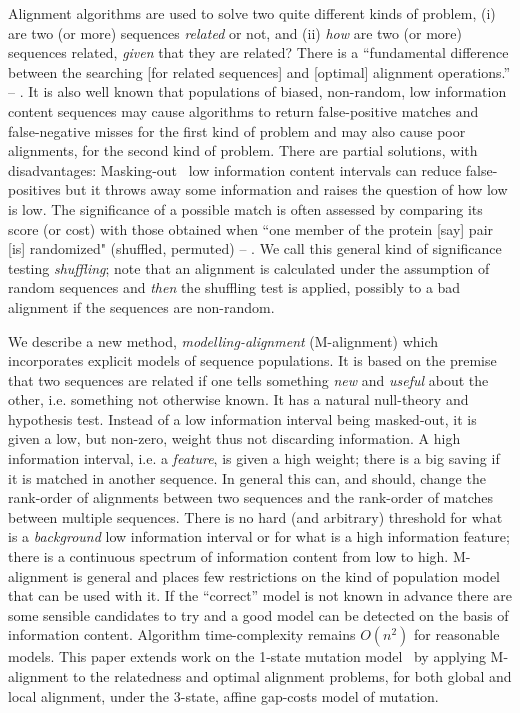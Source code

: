 \documentclass[letterpaper,11pt,oneside]{article}
\begin{document}
\begin{multicols}{2}
Alignment algorithms are used to solve two quite different kinds of problem,
(i) are two (or more) sequences {\em related} or not, and
(ii) {\em how} are two (or more) sequences related,
{\em given} that they are related?
There is a ``fundamental difference between
the searching [for related sequences] and [optimal] alignment operations.'' --
\cite{gribskov96}.
It is also well known that populations of biased, non-random,
low information content sequences may cause algorithms
to return false-positive matches and false-negative misses for
the first kind of problem and may also cause poor alignments,
for the second kind of problem.
There are partial solutions, with disadvantages:
Masking-out~\cite{claverie93} low information content intervals
can reduce false-positives but it throws away some information and
raises the question of how low is low.
The significance of a possible match is often assessed by comparing
its score (or cost) with those obtained when ``one member of
the protein [say] pair [is] randomized"
(shuffled, permuted) -- \cite{needleman70}.
We call this general kind of significance testing {\em shuffling};
note that an alignment is calculated under the assumption of random sequences
and {\em then} the shuffling test is applied, possibly to a bad alignment
if the sequences are non-random.

We describe a new method, {\em modelling-alignment} (M-alignment)
which incorporates explicit models of sequence populations.
It is based on the premise that two sequences are related if one tells
something {\em new} and {\em useful} about the other,
i.e. something not otherwise known.
It has a natural null-theory and hypothesis test.
Instead of a low information interval being masked-out, it is given
a low, but non-zero, weight thus not discarding information.
A high information interval, i.e. a {\em feature}, is given a high weight;
there is a big saving if it is matched in another sequence.
In general this can, and should, change the rank-order of alignments
between two sequences and the rank-order of matches between multiple sequences.
There is no hard (and arbitrary) threshold for what is
a {\em background} low information interval or
for what is a high information feature;
there is a continuous spectrum of information content from low to high.
M-alignment is general and places few restrictions on the kind
of population model that can be used with it.
If the ``correct'' model is not known in advance
there are some sensible candidates to try
and a good model can be detected on the basis of information content.
Algorithm time-complexity remains $O(n^2)$ for reasonable models.
This paper extends work on the 1-state mutation model~\cite{allison99}
by applying M-alignment to
the relatedness and optimal alignment problems,
for both global and local alignment,
under the 3-state, affine gap-costs model \cite{gotoh82} of mutation.


\end{multicols}
\end{document}
